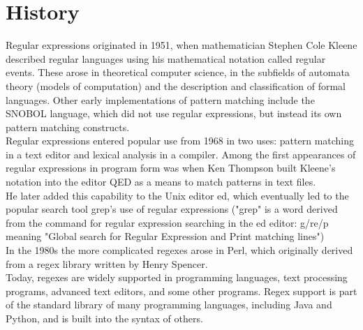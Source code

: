 \documentclass[11pt]{article}
\begin{document}
\section{History}
\hspace*{1cm} Regular expressions originated in 1951, when mathematician Stephen Cole Kleene described regular languages using his mathematical notation called regular events. These arose in theoretical computer science, in the subfields of automata theory (models of computation) and the description and classification of formal languages. Other early implementations of pattern matching include the SNOBOL language, which did not use regular expressions, but instead its own pattern matching constructs. \\
Regular expressions entered popular use from 1968 in two uses: pattern matching in a text editor and lexical analysis in a compiler. Among the first appearances of regular expressions in program form was when Ken Thompson built Kleene's notation into the editor QED as a means to match patterns in text files.
\\ He later added this capability to the Unix editor ed, which eventually led to the popular search tool grep's use of regular expressions ("grep" is a word derived from the command for regular expression searching in the ed editor: g/re/p meaning "Global search for Regular Expression and Print matching lines")\\
In the 1980s the more complicated regexes arose in Perl, which originally derived from a regex library written by Henry Spencer.\\
Today, regexes are widely supported in programming languages, text processing programs, advanced text editors, and some other programs. Regex support is part of the standard library of many programming languages, including Java and Python, and is built into the syntax of others.
\end{document}
